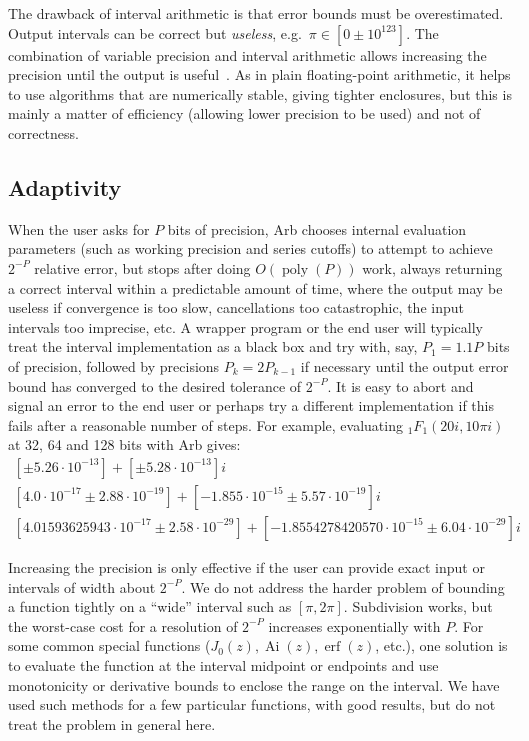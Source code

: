 \documentclass[11pt]{article}
\begin{document}
The drawback of interval arithmetic
is that error bounds must be overestimated.
Output intervals can be correct but
\emph{useless}, e.g.\ $\pi \in [0 \pm 10^{123}]$.
The combination of variable precision and interval arithmetic
allows increasing the precision until the output is useful~\cite{RevolRouillier2005}.
As in plain floating-point arithmetic, it helps to use algorithms
that are numerically stable, giving tighter enclosures,
but this is mainly a matter of efficiency (allowing lower precision to be used) and not of correctness.

\subsection{Adaptivity}

When the user asks for $P$ bits of precision,
Arb chooses internal evaluation parameters
(such as working precision and series cutoffs) to attempt to achieve $2^{-P}$
relative error, but stops
after doing $O(\operatorname{poly}(P))$ work, always returning a correct
interval within a predictable amount of time, where the output
may be useless if convergence is too slow,
cancellations too catastrophic, the input intervals too imprecise, etc.
A wrapper program or the end user will typically treat the
interval implementation as a black box and try
with, say, $P_1 = 1.1 P$ bits of precision, followed by precisions
$P_k = 2P_{k-1}$ if necessary until the output error bound has converged to
the desired tolerance of $2^{-P}$.
It is easy to abort and signal an error to the end user or
perhaps try a different implementation if
this fails after a reasonable number of steps.
For example, evaluating ${}_1F_1(20i, 10\pi i)$ at 32, 64 and 128 bits with Arb gives:
\begin{equation*}
\begin{array}{c}
{}[\pm 5.26 \cdot 10^{-13}] + [\pm 5.28 \cdot 10^{-13}]i \\
{}[4.0 \cdot 10^{-17} \pm 2.88 \cdot 10^{-19}] + [-1.855 \cdot 10^{-15} \pm 5.57 \cdot 10^{-19}]i \\
{}[4.01593625943 \cdot 10^{-17} \pm 2.58 \cdot 10^{-29}] + [-1.8554278420570 \cdot 10^{-15} \pm 6.04 \cdot 10^{-29}]i
\end{array}
\end{equation*}

Increasing the precision is only effective if the user can
provide exact input or intervals of width about $2^{-P}$.
We do not address the harder problem of bounding a function tightly
on a ``wide'' interval such as $[\pi,2\pi]$. Subdivision works,
but the worst-case cost for a resolution of $2^{-P}$ increases exponentially with $P$.
For some common special functions
($J_0(z), \operatorname{Ai}(z), \operatorname{erf}(z)$, etc.),
one solution is to evaluate the
function at the interval midpoint or endpoints and use
monotonicity or derivative bounds to enclose
the range on the interval.
We have used such methods for a few particular functions,
with good results, but do not treat the problem in general here.
\end{document}
